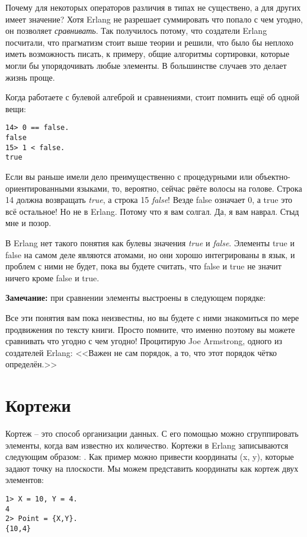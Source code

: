Почему для некоторых операторов различия в типах не существено, а для других имеет значение? Хотя Erlang не разрешает суммировать что попало с чем угодно, он позволяет \emph{сравнивать}. Так получилось потому, что создатели Erlang посчитали, что прагматизм стоит выше теории и решили, что было бы неплохо иметь возможность писать, к примеру, общие алгоритмы сортировки, которые могли бы упорядочивать любые элементы. В большинстве случаев это делает жизнь проще.

Когда работаете с булевой алгеброй и сравнениями, стоит помнить ещё об одной вещи:
\begin{lstlisting}[style=repl]
14> 0 == false.
false
15> 1 < false.
true
\end{lstlisting}

Если вы раньше имели дело преимущественно с процедурными или объектно\--ориентированными языками, то, вероятно, сейчас рвёте волосы на голове. Строка 14 должна возвращать \emph{true}, а строка 15 \emph{false}! Везде false означает 0, а true это всё остальное! Но не в Erlang. Потому что я вам солгал. Да, я вам наврал. Стыд мне и позор.

В Erlang нет такого понятия как булевы значения \emph{true} и \emph{false}. Элементы true и false на самом деле являются атомами, но они хорошо интегрированы в язык, и проблем с ними не будет, пока вы будете считать, что false и true не значит ничего кроме false и true.\\ 
\colorbox{lgray}
{
    \begin{minipage}{1.0\linewidth}
    \textbf{Замечание:} при сравнении элементы выстроены в следующем порядке:\\ 
    
    Все эти понятия вам пока неизвестны, но вы будете с ними знакомиться по мере продвижения по тексту книги. Просто помните, что именно поэтому вы можете сравнивать что угодно с чем угодно! Процитирую Joe Armstrong, одного из создателей Erlang: <<Важен не сам порядок, а то, что этот порядок чётко определён.>>
    \end{minipage}
}
\section{Кортежи}
Кортеж \--- это способ организации данных. С его помощью можно сгруппировать элементы, когда вам известно их количество. Кортежи в Erlang записываются следующим образом: . Как пример можно привести координаты (x, y), которые задают точку на плоскости. Мы можем представить координаты как кортеж двух элементов:
\begin{lstlisting}[style=repl]
1> X = 10, Y = 4.
4
2> Point = {X,Y}.
{10,4}
\end{lstlisting}

